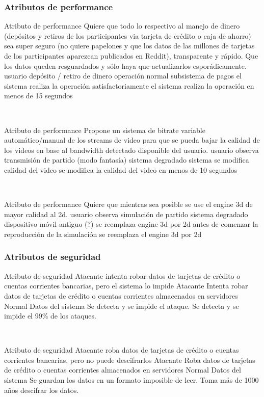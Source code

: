 \subsubsection{Atributos de performance}

\escenario
{Atributo de performance}
{Quiere que todo lo respectivo al manejo de dinero (depósitos y retiros de los participantes
via tarjeta de crédito o caja de ahorro) sea super seguro (no quiere papelones y que los
datos de las millones de tarjetas de los participantes aparezcan publicados en Reddit),
transparente y rápido. Que los datos queden resguardados y sólo haya que actualizarlos
esporádicamente.}
{usuario}
{depósito / retiro de dinero}
{operación normal}
{subsistema de pagos}
{el sistema realiza la operación satisfactoriamente}
{el sistema realiza la operación en menos de 15 segundos}

~

\escenario
{Atributo de performance}
{Propone un sistema de bitrate variable automático/manual de los streams de video para
que se pueda bajar la calidad de los videos en base al bandwidth detectado disponible del
usuario.}
{usuario}
{observa transmisión de partido (modo fantasía)}
{sistema degradado}
{sistema}
{se modifica calidad del video}
{se modifica la calidad del video en menos de 10 segundos}

~

\escenario
{Atributo de performance}
{Quiere que mientras sea posible se use el engine 3d de mayor calidad al 2d.}
{usuario}
{observa simulación de partido}
{sistema degradado}
{dispositivo móvil antiguo (?)}
{se reemplaza engine 3d por 2d}
{antes de comenzar la reproducción de la simulación se reemplaza el engine 3d por 2d}

\subsubsection{Atributos de seguridad}

\escenario
{Atributo de seguridad}
{Atacante intenta robar datos de tarjetas de crédito o cuentas corrientes bancarias, pero el sistema lo impide}
{Atacante}
{Intenta robar datos de tarjetas de crédito o cuentas corrientes almacenados en servidores}
{Normal}
{Datos del sistema}
{Se detecta y se impide el ataque.}
{Se detecta y se impide el 99\% de los ataques.}

~

\escenario
{Atributo de seguridad}
{Atacante roba datos de tarjetas de crédito o cuentas corrientes bancarias, pero no puede descifrarlos}
{Atacante}
{Roba datos de tarjetas de crédito o cuentas corrientes almacenados en servidores}
{Normal}
{Datos del sistema}
{Se guardan los datos en un formato imposible de leer.}
{Toma más de 1000 años descifrar los datos.}

